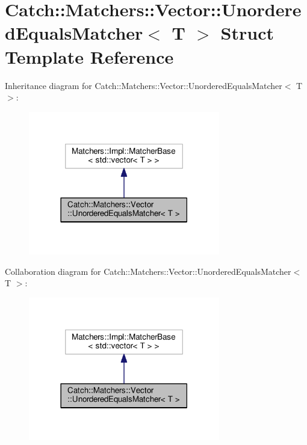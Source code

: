 \hypertarget{structCatch_1_1Matchers_1_1Vector_1_1UnorderedEqualsMatcher}{}\section{Catch\+:\+:Matchers\+:\+:Vector\+:\+:Unordered\+Equals\+Matcher$<$ T $>$ Struct Template Reference}
\label{structCatch_1_1Matchers_1_1Vector_1_1UnorderedEqualsMatcher}


Inheritance diagram for Catch\+:\+:Matchers\+:\+:Vector\+:\+:Unordered\+Equals\+Matcher$<$ T $>$\+:\nopagebreak
\begin{figure}[H]
\begin{center}
\leavevmode
\includegraphics[width=237pt]{structCatch_1_1Matchers_1_1Vector_1_1UnorderedEqualsMatcher__inherit__graph}
\end{center}
\end{figure}


Collaboration diagram for Catch\+:\+:Matchers\+:\+:Vector\+:\+:Unordered\+Equals\+Matcher$<$ T $>$\+:\nopagebreak
\begin{figure}[H]
\begin{center}
\leavevmode
\includegraphics[width=237pt]{structCatch_1_1Matchers_1_1Vector_1_1UnorderedEqualsMatcher__coll__graph}
\end{center}
\end{figure}
